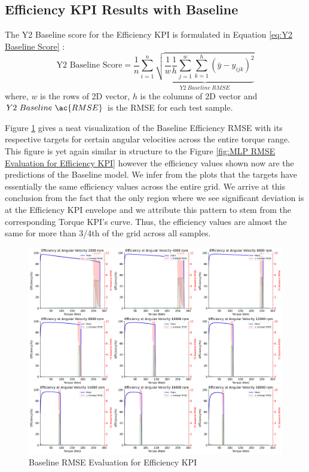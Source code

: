 \documentclass{report} %
\begin{document}
\subsection{Efficiency \ac{KPI} Results with Baseline}\label{sec:3D Efficiency Grid Results with Baseline}

The Y2 Baseline score for the Efficiency \ac{KPI} is formulated in Equation \ref{eq:Y2 Baseline Score} :
\begin{equation}
    \text{Y2 Baseline Score} = \frac{1}{n} \sum_{i=1}^{n} \underbrace{ \sqrt{\frac{1}{w} \frac{1}{h} \sum_{j=1}^{w} \sum_{k=1}^{h} (\bar{y} - y_{ijk})^2}}_{Y2\ Baseline\ RMSE}
    \label{eq:Y2 Baseline Score}
\end{equation}
where, \(w\) is the rows of 2\ac{D} vector, \(h\) is the columns of 2\ac{D} vector and \(Y2\ Baseline\ \ac{RMSE}\) is the \ac{RMSE} for each test sample.

Figure \ref{fig:Baseline RMSE Evaluation for Efficiency KPI} gives a neat visualization of the Baseline Efficiency \ac{RMSE} with its respective targets for certain angular velocities  
across the entire torque range. This figure is yet again similar in structure to the Figure \ref{fig:MLP RMSE Evaluation for Efficiency KPI} however the efficiency values 
shown now are the predictions of the Baseline model. We infer from the plots that the targets have essentially the same efficiency values across the entire grid.
We arrive at this conclusion from the fact that the only region where we see significant deviation is at the Efficiency \ac{KPI} envelope and we attribute this 
pattern to stem from the corresponding Torque \ac{KPI}'s curve. Thus, the efficiency values are almost the same for more than 3/4th of the grid across all samples.
\begin{figure}[H]
    \centering
    \includegraphics[width=1\textwidth]{./ReportImages/rmse_eta_Baseline.png} 
    \caption{Baseline \ac{RMSE} Evaluation for Efficiency \ac{KPI}} 
    \label{fig:Baseline RMSE Evaluation for Efficiency KPI}
\end{figure}
\end{document}
